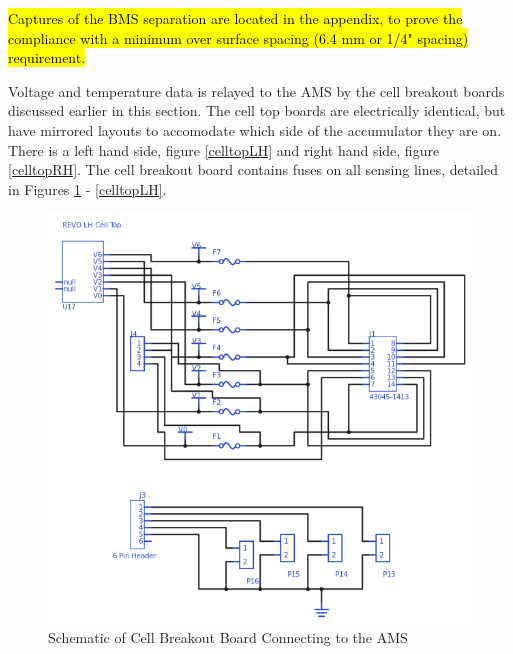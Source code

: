 \documentclass{article}
\DeclareRobustCommand{\hlr}[1]{{\sethlcolor{red}\hl{#1}}}
\begin{document}
            \hlr{Captures of the BMS separation are located in the appendix, to prove the compliance with a minimum over surface spacing (6.4 mm or 1/4" spacing) requirement.}


            Voltage and temperature data is relayed to the AMS by the cell breakout boards discussed earlier in this section. The cell top boards are electrically identical, but have mirrored layouts to accomodate which side of the accumulator they are on. There is a left hand side, figure \ref{celltopLH} and right hand side, figure \ref{celltopRH}. The cell breakout board contains fuses on all sensing lines, detailed in Figures \ref{celltopschem} - \ref{celltopLH}.

            \begin{figure}[H]
                \centering
                \includegraphics[width = 0.8 \textwidth]{CellTopSchem}
                \caption{Schematic of Cell Breakout Board Connecting to the AMS}
                \label{celltopschem}
            \end{figure}

\end{document}
